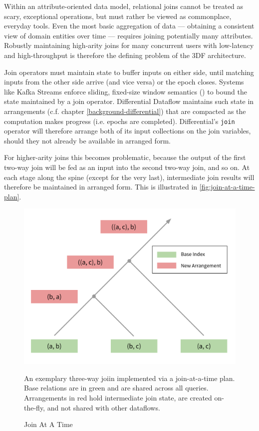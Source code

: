 \documentclass[../catalog.tex]{subfiles}
\begin{document}
Within an attribute-oriented data model, relational joins cannot be
treated as scary, exceptional operations, but must rather be viewed as
commonplace, everyday tools. Even the most basic aggregation of data —
obtaining a consistent view of domain entities over time — requires
joining potentially many attributes. Robustly maintaining high-arity
joins for many concurrent users with low-latency and high-throughput
is therefore the defining problem of the 3DF architecture.

Join operators must maintain state to buffer inputs on either side,
until matching inputs from the other side arrive (and vice versa) or
the epoch closes. Systems like Kafka Streams enforce sliding,
fixed-size window semantics (\cite{kafkadocs}) to bound the state
maintained by a join operator. Differential Dataflow maintains such
state in arrangements (c.f. chapter \ref{background-differential})
that are compacted as the computation makes progress (i.e. epochs are
completed). Differential's \texttt{join} operator will therefore
arrange both of its input collections on the join variables, should
they not already be available in arranged form.

For higher-arity joins this becomes problematic, because the output of
the first two-way join will be fed as an input into the second two-way
join, and so on. At each stage along the spine (except for the very
last), intermediate join results will therefore be maintained in
arranged form. This is illustrated in
\autoref{fig:join-at-a-time-plan}.

\begin{figure}[h!]
  \includegraphics[width=1.0\linewidth]{diagrams/join-at-a-time}
  \caption{Join At A Time}
  \label{fig:join-at-a-time-plan}

  \medskip
  \small

  An exemplary three-way joiin implemented via a join-at-a-time
  plan. Base relations are in green and are shared across all
  queries. Arrangements in red hold intermediate join state, are
  created on-the-fly, and not shared with other dataflows.
\end{figure}
\end{document}
